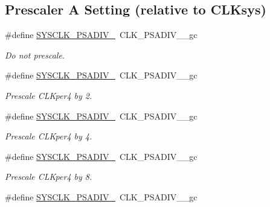 \subsection*{Prescaler A Setting (relative to C\-L\-Ksys)}
\begin{DoxyCompactItemize}
\item 
\hypertarget{group__sysclk__group_gad1605f1a9c61fd1d5172b9fa771d03e1}{\#define \hyperlink{group__sysclk__group_gad1605f1a9c61fd1d5172b9fa771d03e1}{S\-Y\-S\-C\-L\-K\-\_\-\-P\-S\-A\-D\-I\-V\-\_}~C\-L\-K\-\_\-\-P\-S\-A\-D\-I\-V\-\_\-\_\-gc}\label{group__sysclk__group_gad1605f1a9c61fd1d5172b9fa771d03e1}

\begin{DoxyCompactList}\small\item\em Do not prescale. \end{DoxyCompactList}\item 
\hypertarget{group__sysclk__group_ga925a1e16ae43da42a686be8a2bc27061}{\#define \hyperlink{group__sysclk__group_ga925a1e16ae43da42a686be8a2bc27061}{S\-Y\-S\-C\-L\-K\-\_\-\-P\-S\-A\-D\-I\-V\-\_}~C\-L\-K\-\_\-\-P\-S\-A\-D\-I\-V\-\_\-\_\-gc}\label{group__sysclk__group_ga925a1e16ae43da42a686be8a2bc27061}

\begin{DoxyCompactList}\small\item\em Prescale C\-L\-Kper4 by 2. \end{DoxyCompactList}\item 
\hypertarget{group__sysclk__group_ga373868a29537f1e64d3b53dcd6f8ca7e}{\#define \hyperlink{group__sysclk__group_ga373868a29537f1e64d3b53dcd6f8ca7e}{S\-Y\-S\-C\-L\-K\-\_\-\-P\-S\-A\-D\-I\-V\-\_}~C\-L\-K\-\_\-\-P\-S\-A\-D\-I\-V\-\_\-\_\-gc}\label{group__sysclk__group_ga373868a29537f1e64d3b53dcd6f8ca7e}

\begin{DoxyCompactList}\small\item\em Prescale C\-L\-Kper4 by 4. \end{DoxyCompactList}\item 
\hypertarget{group__sysclk__group_gaca6f6c0e9e295a77add8a146ea3e7dc8}{\#define \hyperlink{group__sysclk__group_gaca6f6c0e9e295a77add8a146ea3e7dc8}{S\-Y\-S\-C\-L\-K\-\_\-\-P\-S\-A\-D\-I\-V\-\_}~C\-L\-K\-\_\-\-P\-S\-A\-D\-I\-V\-\_\-\_\-gc}\label{group__sysclk__group_gaca6f6c0e9e295a77add8a146ea3e7dc8}

\begin{DoxyCompactList}\small\item\em Prescale C\-L\-Kper4 by 8. \end{DoxyCompactList}\item 
\hypertarget{group__sysclk__group_ga5e5c2c9e0f47f5ab828015dfc7fa67f3}{\#define \hyperlink{group__sysclk__group_ga5e5c2c9e0f47f5ab828015dfc7fa67f3}{S\-Y\-S\-C\-L\-K\-\_\-\-P\-S\-A\-D\-I\-V\-\_}~C\-L\-K\-\_\-\-P\-S\-A\-D\-I\-V\-\_\-\_\-gc}\label{group__sysclk__group_ga5e5c2c9e0f47f5ab828015dfc7fa67f3}


\end{DoxyCompactItemize}
